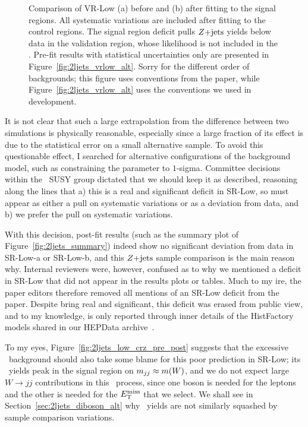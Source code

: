 \begin{figure}[tp]
\begin{subfigure}{0.48\textwidth}
\end{subfigure}
\caption[
Comparison of VR-Low before and after fitting to the signal regions
]{%
Comparison of VR-Low (a) before and (b) after fitting to the signal regions.
All systematic variations are included after fitting to the control regions.
The signal region deficit pulls $Z\mathrm{+jets}$ yields below data in the validation
region, whose likelihood is not included in the \heplikelihood.
Pre-fit results with statistical uncertainties only are presented in
Figure~\ref{fig:2ljets_vrlow_alt}.
Sorry for the different order of backgrounds; this figure uses
conventions from the paper, while Figure~\ref{fig:2ljets_vrlow_alt}
uses the conventions we used in development.
}
\label{fig:2ljets_low_vrlow_pre_post}
\end{figure}

It is not clear that such a large extrapolation from the difference between
two simulations is physically reasonable, especially since a large fraction
of its effect is due to the statistical error on a small alternative sample.
To avoid this questionable effect, I searched for alternative configurations
of the background model, such as constraining the parameter to $1$-sigma.
Committee decisions within the \atlas\ SUSY group dictated that we should keep
it as described, reasoning along the lines that
a) this is a real and significant deficit in SR-Low, so must appear as either
a pull on systematic variations or as a deviation from data, and
b) we prefer the pull on systematic variations.

With this decision, post-fit results (such as the summary plot of
Figure~\ref{fig:2ljets_summary})
indeed show no significant deviation from data in SR-Low-a or SR-Low-b,
and this $Z\mathrm{+jets}$ sample comparison is the main reason why.
Internal reviewers were, however, confused as to why we mentioned a deficit in
SR-Low that did not appear in the results plots or tables.
Much to my ire, the paper editors therefore removed all mentions of an SR-Low
deficit from the paper.
Despite bring real and significant, this deficit was erased from public view,
and to my knowledge, is only reported through inner details of
the HistFactory models shared in our HEPData archive~\cite{hepdata.116034}.

To my eyes, Figure~\ref{fig:2ljets_low_crz_pre_post} suggests that the
excessive \diboson\ background should also take some blame for this poor
prediction in SR-Low;
its \diboson\ yields peak in the signal region on $m_{jj} \approx m(W)$, and
we do not expect large $W\rightarrow jj$ contributions in this \diboson\ process,
since one boson is needed for the leptons and the other is needed for the
$E_\mathrm{T}^\mathrm{miss}$ that we select.
We shall see in Section~\ref{sec:2ljets_diboson_alt} why \diboson\ yields are
not similarly squashed by sample comparison variations.



